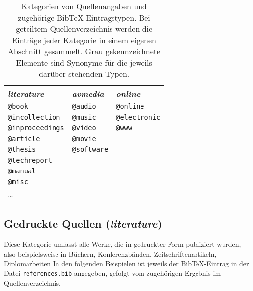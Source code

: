 \begin{table}
\caption{Kategorien von Quellenangaben und zugehörige BibTeX-Eintragstypen.
Bei geteiltem Quellenverzeichnis werden die Einträge jeder Kategorie in einem
eigenen Abschnitt gesammelt.
Grau gekennzeichnete Elemente sind Synonyme für die jeweils darüber stehenden Typen.}
\label{tab:BibKategorien}
\centering
{}
\setlength{\tabcolsep}{6mm}
\begin{tabular}{lll}
	\emph{literature} & \emph{avmedia} & \emph{online} \\
	\hline
	\texttt{@book}          & \texttt{@audio}                & \texttt{@online} \\
	\texttt{@incollection}  & \texttt{\color{midgray}@music} & \texttt{\color{midgray}@electronic} \\
	\texttt{@inproceedings} & \texttt{@video}                & \texttt{\color{midgray}@www} \\
	\texttt{@article}       & \texttt{@movie}                &  \\
	\texttt{@thesis}        & \texttt{@software}             &  \\
	\texttt{@techreport}    &  &  \\
	\texttt{@manual}        &  &  \\
	\texttt{@misc}          &  &  \\
	\ldots                  &  &  \\
	\hline
\end{tabular}
\end{table}


\subsection{Gedruckte Quellen (\emph{literature})}
\label{sec:KategorieLiterature}

Diese Kategorie umfasst alle Werke, die in gedruckter Form publiziert wurden,
also beispielsweise in Büchern, Konferenzbänden, Zeitschriftenartikeln, Diplomarbeiten \usw
In den folgenden Beispielen ist jeweils der BibTeX-Eintrag in der Datei \nolinkurl{references.bib}
angegeben, gefolgt vom zugehörigen Ergebnis im Quellenverzeichnis.


